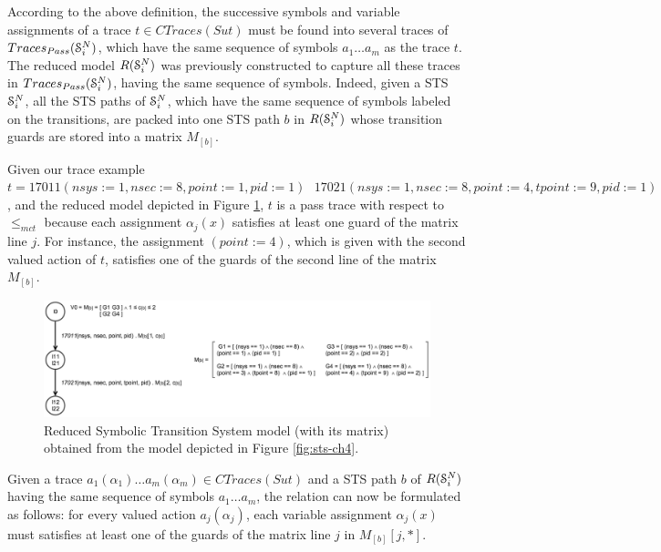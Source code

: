 According to the above definition, the successive symbols and
variable assignments of a trace $t \in CTraces({Sut})$ must be
found into several traces of $Traces_{Pass}(\EuScript{S}_i^{N})$,
which have the same sequence of symbols $a_1 \dots a_m$ as the
trace $t$. The reduced model $R(\EuScript{S}_i^{N})$ was
previously constructed to capture all these traces in
$Traces_{Pass}(\EuScript{S}_i^{N})$, having the same sequence of
symbols. Indeed, given a STS $\EuScript{S}_i^{N}$, all the STS
paths of $\EuScript{S}_i^{N}$, which have the same sequence of
symbols labeled on the transitions, are packed into one STS path
$b$ in $R(\EuScript{S}_i^{N})$ whose transition guards are stored
into a matrix $M_{[b]}$.

\begin{example}
    Given our trace example $t = 17011(nsys:=1, nsec:=8,
    point:=1, pid:=1)\text{ }17021(nsys:=1, nsec:=8, point:=4,
    tpoint:=9, pid:=1)$, and the reduced model depicted in Figure
    \ref{fig:sts-reduced-ch4}, $t$ is a pass trace with respect
    to $\leq_{mct}$ because each assignment $\alpha_j(x)$
    satisfies at least one guard of the matrix line $j$. For
    instance, the assignment $(point := 4)$, which is given with
    the second valued action of $t$, satisfies one of the guards
    of the second line of the matrix $M_{[b]}$.

    \begin{figure}[h]
        \begin{center}
            \includegraphics[width=1.0\linewidth]{figures/reduced_sts_ch4.png}
        \end{center}

        \caption{Reduced Symbolic Transition System model (with
        its matrix) obtained from the model depicted in Figure
        \ref{fig:sts-ch4}.}
        \label{fig:sts-reduced-ch4}
    \end{figure}
\end{example}

Given a trace $a_1(\alpha_1) \dots a_m(\alpha_m) \in
CTraces({Sut})$ and a STS path $b$ of $R(\EuScript{S}_i^{N})$
having the same sequence of symbols $a_1 \dots a_m$, the relation
can now be formulated as follows: for every valued action
$a_j(\alpha_j)$, each variable assignment $\alpha_j(x)$ must
satisfies at least one of the guards of the matrix line $j$ in
$M_{[b]}[j,*]$.

